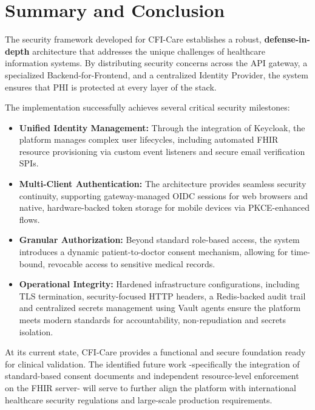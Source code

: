 
\section{Summary and Conclusion}\label{sec:security-summary}

The security framework developed for CFI-Care establishes a robust, \textbf{defense-in-depth} architecture that addresses the unique challenges of healthcare information systems. 
By distributing security concerns across the API gateway, a specialized Backend-for-Frontend, and a centralized Identity Provider, the system ensures that \ac{PHI} is protected at every layer of the stack.

The implementation successfully achieves several critical security milestones:
\begin{itemize}
    \item \textbf{Unified Identity Management:} Through the integration of Keycloak, the platform manages complex user lifecycles, including automated \ac{FHIR} resource provisioning via custom event 
    listeners and secure email verification SPIs.
    \item \textbf{Multi-Client Authentication:} The architecture provides seamless security continuity,
     supporting gateway-managed \ac{OIDC} sessions for web browsers and native, hardware-backed token storage for mobile devices via PKCE-enhanced flows.
    \item \textbf{Granular Authorization:} Beyond standard role-based access, the system introduces a dynamic patient-to-doctor consent mechanism, 
    allowing for time-bound, revocable access to sensitive medical records.
    \item \textbf{Operational Integrity:} Hardened infrastructure configurations, including TLS termination,
     security-focused HTTP headers,  a Redis-backed audit trail and centralized secrets management using Vault agents ensure the platform meets modern standards for accountability, non-repudiation and secrets isolation.
\end{itemize}

At its current state, CFI-Care provides a functional and secure foundation ready for clinical validation. 
The identified future work -specifically the integration of standard-based consent documents and independent resource-level enforcement on the \ac{FHIR} server- will serve to further align the platform with international healthcare security regulations and large-scale production requirements.



